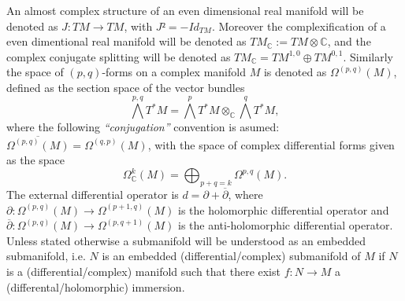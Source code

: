 \documentclass[12pt,twoside,a4paper]{report}
\newcommand{\co}{\ensuremath{\mathbb C }}
\begin{document}
An almost complex structure of an even dimensional real manifold will be denoted as $J:TM\rightarrow TM$, with $J²=-Id_{TM}$. Moreover the complexification of a even dimentional real manifold will be denoted as $TM_{\co}:=TM\otimes\co$, and the complex conjugate splitting will be denoted as $TM_{\co}=TM^{1,0}\oplus TM^{0,1}$.
Similarly the space of $(p,q)$-forms on a complex manifold $M$ is denoted as $\Omega^{(p,q)}(M)$, defined as the section space of the vector bundles
\[
  \bigwedge^{p,q}T^{*}M=\bigwedge^{p}T^{*}M\otimes_{\co}\bigwedge^{q}T^{*}M,
\]
\noindent where the following \emph{``conjugation''} convention is asumed: $\overline{\Omega^{(p,q)}(M)}=\Omega^{(q,p)}(M)$, with the space of complex differential forms given as the space
\[
  \Omega^{k}_{\co}(M)=\bigoplus_{p+q=k}\Omega^{p,q}(M).
\]
\noindent The external differential operator is $d=\partial + \overline{\partial}$, where $\partial:\Omega^{(p,q)}(M)\rightarrow \Omega^{(p+1,q)}(M)$ is the holomorphic differential operator and $\overline{\partial}:\Omega^{(p,q)}(M)\rightarrow\Omega^{(p,q+1)}(M)$ is the anti-holomorphic differential operator.\\
Unless stated otherwise a submanifold will be understood as an embedded submanifold, i.e. $N$ is an embedded (differential/complex) submanifold of $M$ if $N$ is a (differential/complex) manifold such that there exist $f:N\rightarrow M$ a (differental/holomorphic) immersion.
\end{document}
